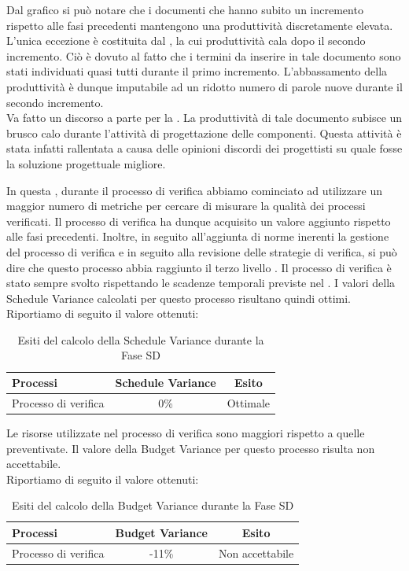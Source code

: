 				Dal grafico si può notare che i documenti che hanno subito un incremento rispetto alle fasi precedenti mantengono una produttività discretamente elevata. L'unica eccezione è costituita dal , la cui produttività cala dopo il secondo incremento. Ciò è dovuto al fatto che i termini da inserire in tale documento sono stati individuati quasi tutti durante il primo incremento. L'abbassamento della produttività è dunque imputabile ad un ridotto numero di parole nuove durante il secondo incremento.\\
				Va fatto un discorso a parte per la . La produttività di tale documento subisce un brusco calo durante l'attività di progettazione delle componenti. Questa attività è stata infatti rallentata a causa delle opinioni discordi dei progettisti su quale fosse la soluzione progettuale migliore.
			
			In questa , durante il processo di verifica abbiamo cominciato ad utilizzare un maggior numero di metriche per cercare di misurare la qualità dei processi verificati. Il processo di verifica ha dunque acquisito un valore aggiunto rispetto alle fasi precedenti. Inoltre, in seguito all'aggiunta di norme inerenti la gestione del processo di verifica e in seguito alla revisione delle strategie di verifica, si può dire che questo processo abbia raggiunto il terzo livello . 
			Il processo di verifica è stato sempre svolto rispettando le scadenze temporali previste nel . I valori della Schedule Variance calcolati per questo processo risultano quindi ottimi.\\
			Riportiamo di seguito il valore ottenuti:
			\begin{table}[H]
					\centering
					\begin{tabu}{| l | c | c |}
							\hline
							Processi 							& Schedule Variance	& Esito		\\ \hline \hline
							Processo di verifica & 0\% & Ottimale \\ \hline
						\end{tabu}
					\caption{Esiti del calcolo della Schedule Variance durante la Fase SD}
				\end{table}	

			Le risorse utilizzate nel processo di verifica sono maggiori rispetto a quelle preventivate. Il valore della Budget Variance per questo processo risulta non accettabile.\\ 
			Riportiamo di seguito il valore ottenuti:
			\begin{table}[H]
					\centering
					\begin{tabu}{| l | c | c |}
							\hline
							Processi 							& Budget Variance	& Esito		\\ \hline \hline
							Processo di verifica & -11\% & Non accettabile \\ \hline
						\end{tabu}
					\caption{Esiti del calcolo della Budget Variance durante la Fase SD}
				\end{table}	
							
